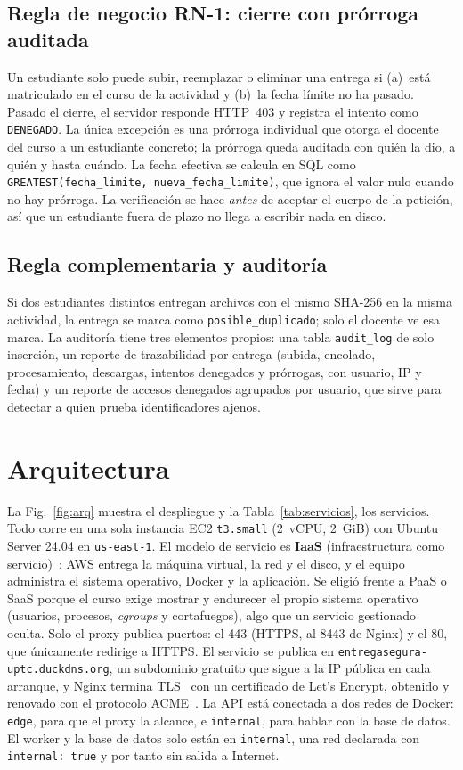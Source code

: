 \documentclass[conference,a4paper]{IEEEtran}
\newcommand{\cod}[1]{\texttt{#1}}
\begin{document}
\subsection{Regla de negocio RN-1: cierre con prórroga auditada}
Un estudiante solo puede subir, reemplazar o eliminar una entrega si (a)~está matriculado en el curso de la actividad y (b)~la fecha límite no ha pasado. Pasado el cierre, el servidor responde HTTP~403 y registra el intento como \cod{DENEGADO}. La única excepción es una prórroga individual que otorga el docente del curso a un estudiante concreto; la prórroga queda auditada con quién la dio, a quién y hasta cuándo. La fecha efectiva se calcula en SQL como \cod{GREATEST(fecha\_limite, nueva\_fecha\_limite)}, que ignora el valor nulo cuando no hay prórroga. La verificación se hace \emph{antes} de aceptar el cuerpo de la petición, así que un estudiante fuera de plazo no llega a escribir nada en disco.

\subsection{Regla complementaria y auditoría}
Si dos estudiantes distintos entregan archivos con el mismo SHA-256 en la misma actividad, la entrega se marca como \cod{posible\_duplicado}; solo el docente ve esa marca. La auditoría tiene tres elementos propios: una tabla \cod{audit\_log} de solo inserción, un reporte de trazabilidad por entrega (subida, encolado, procesamiento, descargas, intentos denegados y prórrogas, con usuario, IP y fecha) y un reporte de accesos denegados agrupados por usuario, que sirve para detectar a quien prueba identificadores ajenos.

\section{Arquitectura}\label{sec:arq}

La Fig.~\ref{fig:arq} muestra el despliegue y la Tabla~\ref{tab:servicios}, los servicios. Todo corre en una sola instancia EC2 \cod{t3.small} (2~vCPU, 2~GiB) con Ubuntu Server 24.04 en \cod{us-east-1}. El modelo de servicio es \textbf{IaaS} (infraestructura como servicio)~\cite{nist145}: AWS entrega la máquina virtual, la red y el disco, y el equipo administra el sistema operativo, Docker y la aplicación. Se eligió frente a PaaS o SaaS porque el curso exige mostrar y endurecer el propio sistema operativo (usuarios, procesos, \textit{cgroups} y cortafuegos), algo que un servicio gestionado oculta. Solo el proxy publica puertos: el 443 (HTTPS, al 8443 de Nginx) y el 80, que únicamente redirige a HTTPS. El servicio se publica en \cod{entregasegura-uptc.duckdns.org}, un subdominio gratuito que sigue a la IP pública en cada arranque, y Nginx termina TLS~\cite{rfc8446} con un certificado de Let's Encrypt, obtenido y renovado con el protocolo ACME~\cite{rfc8555}. La API está conectada a dos redes de Docker: \cod{edge}, para que el proxy la alcance, e \cod{internal}, para hablar con la base de datos. El worker y la base de datos solo están en \cod{internal}, una red declarada con \cod{internal: true} y por tanto sin salida a Internet.
\end{document}
